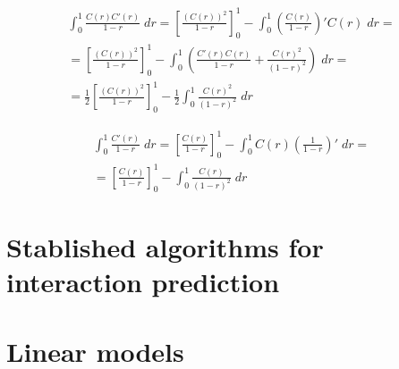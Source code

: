 \begin{multline}
    \int_{0}^{1} \frac{C(r)C'(r)}{1-r}\;dr
    =
        \left[\frac{(C(r))^2}{1-r}\right]_{0}^{1}
        - \int_{0}^{1} \left(\frac{C(r)}{1-r}\right)' C(r)\;dr
    =\\
    =
        \left[\frac{(C(r))^2}{1-r}\right]_{0}^{1}
        - \int_{0}^{1} \left(
            \frac{C'(r)C(r)}{1-r}
            + \frac{C(r)^2}{(1-r)^2}
        \right)
        \;dr
    =\\
    =
        \frac{1}{2}
        \left[\frac{(C(r))^2}{1-r}\right]_{0}^{1}
        -
        \frac{1}{2}
        \int_{0}^{1}
            \frac{C(r)^2}{(1-r)^2}
        \;dr
\end{multline}

\begin{multline}
    \int_{0}^{1} \frac{C'(r)}{1-r}\;dr
    =
        \left[\frac{C(r)}{1-r}\right]_{0}^{1}
        - \int_{0}^{1} C(r)\left(\frac{1}{1-r}\right)'\;dr
    =\\
    =
        \left[\frac{C(r)}{1-r}\right]_{0}^{1}
        - \int_{0}^{1} \frac{C(r)}{(1-r)^2}\;dr
\end{multline}


\section{Stablished algorithms for interaction prediction}
\label{sec:literature_algorithms}


\section{Linear models}
\label{sec:linear_models}

